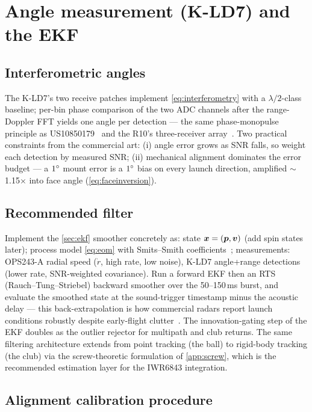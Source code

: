 \section{Angle measurement (K-LD7) and the EKF}
\label{app:ekf}

\subsection{Interferometric angles}

The K-LD7's two receive patches implement \cref{eq:interferometry} with
a $\lambda/2$-class baseline; per-bin phase comparison of the two ADC
channels after the range-Doppler FFT yields one angle per detection ---
the same phase-monopulse principle as
US10850179~\cite{us10850179} and the R10's three-receiver
array~\cite{garminr10data}. Two practical constraints from the
commercial art: (i) angle error grows as SNR falls, so weight each
detection by measured SNR; (ii) mechanical alignment dominates the
error budget --- a $1\si{\degree}$ mount error is a $1\si{\degree}$ bias on every
launch direction, amplified $\sim$1.15$\times$ into face angle
(\cref{eq:faceinversion}).

\subsection{Recommended filter}

Implement the \cref{sec:ekf} smoother concretely as:
state $\bm{x} = (\bm{p}, \bm{v})$ (add spin states later);
process model \cref{eq:eom} with Smits--Smith
coefficients~\cite{smitssmith}; measurements: OPS243-A radial speed
($\dot r$, high rate, low noise), K-LD7 angle+range detections (lower
rate, SNR-weighted covariance). Run a forward EKF then an RTS
(Rauch--Tung--Striebel) backward smoother over the 50--150\,ms burst,
and evaluate the smoothed state at the sound-trigger timestamp minus
the acoustic delay --- this back-extrapolation is how commercial radars
report launch conditions robustly despite early-flight
clutter~\cite{us8845442,us10338209}. The innovation-gating step of the
EKF doubles as the outlier rejector for multipath and club returns.
The same filtering architecture extends from point tracking (the ball)
to rigid-body tracking (the club) via the screw-theoretic formulation
of \cref{app:screw}, which is the recommended estimation layer for the
IWR6843 integration.

\subsection{Alignment calibration procedure}

